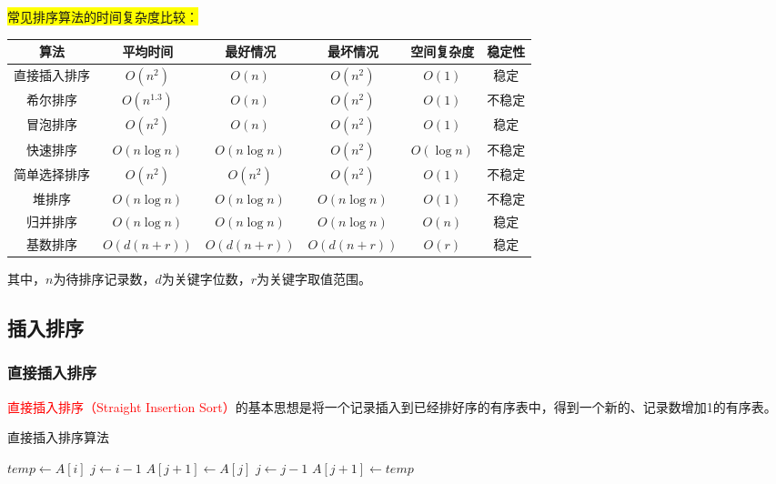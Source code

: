 \documentclass{../../note}
\begin{document}
\colorbox{yellow}{常见排序算法的时间复杂度比较：}
\begin{center}
  \begin{tabular}{|c|c|c|c|c|c|}
    \hline
    \textbf{算法} & \textbf{平均时间} & \textbf{最好情况} & \textbf{最坏情况} & \textbf{空间复杂度} & \textbf{稳定性} \\
    \hline
    直接插入排序 & $O(n^2)$ & $O(n)$ & $O(n^2)$ & $O(1)$ & 稳定 \\
    \hline
    希尔排序 & $O(n^{1.3})$ & $O(n)$ & $O(n^2)$ & $O(1)$ & 不稳定 \\
    \hline
    冒泡排序 & $O(n^2)$ & $O(n)$ & $O(n^2)$ & $O(1)$ & 稳定 \\
    \hline
    快速排序 & $O(n\log{n})$ & $O(n\log{n})$ & $O(n^2)$ & $O(\log{n})$ & 不稳定 \\
    \hline
    简单选择排序 & $O(n^2)$ & $O(n^2)$ & $O(n^2)$ & $O(1)$ & 不稳定 \\
    \hline
    堆排序 & $O(n\log{n})$ & $O(n\log{n})$ & $O(n\log{n})$ & $O(1)$ & 不稳定 \\
    \hline
    归并排序 & $O(n\log{n})$ & $O(n\log{n})$ & $O(n\log{n})$ & $O(n)$ & 稳定 \\
    \hline
    基数排序 & $O(d(n+r))$ & $O(d(n+r))$ & $O(d(n+r))$ & $O(r)$ & 稳定 \\
    \hline
  \end{tabular}
\end{center}
其中，$n$为待排序记录数，$d$为关键字位数，$r$为关键字取值范围。

\subsection{插入排序}

\subsubsection{直接插入排序}
\textcolor{red}{直接插入排序（Straight Insertion Sort）}的基本思想是将一个记录插入到已经排好序的有序表中，得到一个新的、记录数增加1的有序表。

\begin{algorithm}
  \caption{直接插入排序算法}
  \begin{algorithmic}[1]
    \State $temp \gets A[i]$ 
    \State $j \gets i - 1$ 
    \State $A[j+1] \gets A[j]$ 
    \State $j \gets j - 1$
    \EndWhile
    \State $A[j+1] \gets temp$ 
    \EndFor
    \EndProcedure
  \end{algorithmic}
\end{algorithm}
\end{document}
